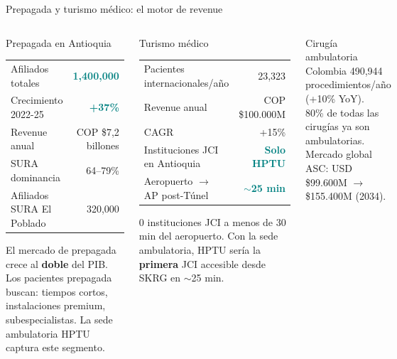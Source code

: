 \documentclass[aspectratio=169, 11pt]{beamer}
\newcommand{\highlight}[1]{\textcolor{teal}{\textbf{#1}}}
\newcommand{\src}[1]{\par\vspace{2pt}{\tiny\textcolor{slate}{Fuente: #1}}}
\begin{document}
\begin{frame}{Prepagada y turismo médico: el motor de revenue}

\begin{columns}[T]
\begin{block}{\small Prepagada en Antioquia}
\footnotesize
\begin{tabular}{@{}lr@{}}
\toprule
Afiliados totales & \highlight{1,400,000} \\
Crecimiento 2022-25 & \highlight{+37\%} \\
Revenue anual & COP \$7,2 billones \\
SURA dominancia & 64--79\% \\
Afiliados SURA El Poblado & 320,000 \\
\bottomrule
\end{tabular}

\vspace{3pt}
{\scriptsize El mercado de prepagada crece al \textbf{doble} del PIB. Los pacientes prepagada buscan: tiempos cortos, instalaciones premium, subespecialistas. La sede ambulatoria HPTU captura este segmento.}
\end{block}

\begin{exampleblock}{\small Turismo médico}
\footnotesize
\begin{tabular}{@{}lr@{}}
\toprule
Pacientes internacionales/año & 23,323 \\
Revenue anual & COP \$100.000M \\
CAGR & +15\% \\
\midrule
Instituciones JCI en Antioquia & \highlight{Solo HPTU} \\
Aeropuerto $\to$ AP post-Túnel & \highlight{$\sim$25 min} \\
\bottomrule
\end{tabular}

\vspace{3pt}
{\scriptsize 0 instituciones JCI a menos de 30 min del aeropuerto. Con la sede ambulatoria, HPTU sería la \textbf{primera} JCI accesible desde SKRG en $\sim$25 min.}
\end{exampleblock}

\vspace{2pt}
\begin{block}{\small Cirugía ambulatoria Colombia}
\scriptsize
490,944 procedimientos/año (+10\% YoY).\\
80\% de todas las cirugías ya son ambulatorias.\\
Mercado global ASC: USD \$99.600M $\to$ \$155.400M (2034).
\end{block}
\end{columns}

\src{ProColombia, MinSalud SISPRO, Supersalud, JCI Directory}
\end{frame}
\end{document}
